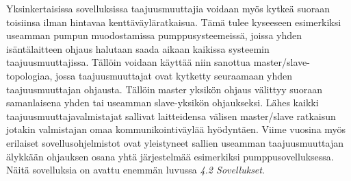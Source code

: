 \documentclass[finnish,12pt,a4paper,pdftex,elec,utf8]{aaltothesis}
\begin{document}
Yksinkertaisissa sovelluksissa taajuusmuuttajia voidaan myös kytkeä suoraan toisiinsa ilman hintavaa kenttäväyläratkaisua. Tämä tulee kyseeseen esimerkiksi useamman pumpun muodostamissa pumppusysteemeissä, joissa yhden isäntälaitteen ohjaus halutaan saada aikaan kaikissa systeemin taajuusmuuttajissa. Tällöin voidaan käyttää niin sanottua master/slave-topologiaa, jossa taajuusmuuttajat ovat kytketty seuraamaan yhden taajuusmuuttajan ohjausta. Tällöin master yksikön ohjaus välittyy suoraan samanlaisena yhden tai useamman slave-yksikön ohjaukseksi. Lähes kaikki taajuusmuuttajavalmistajat sallivat laitteidensa välisen master/slave ratkaisun jotakin valmistajan omaa kommunikointiväylää hyödyntäen. Viime vuosina myös erilaiset sovellusohjelmistot ovat yleistyneet sallien useamman taajuusmuuttajan älykkään ohjauksen osana yhtä järjestelmää esimerkiksi pumppusovelluksessa. Näitä sovelluksia on avattu enemmän luvussa  \textit{4.2 Sovellukset}. \cite{880hwman}


\end{document}
